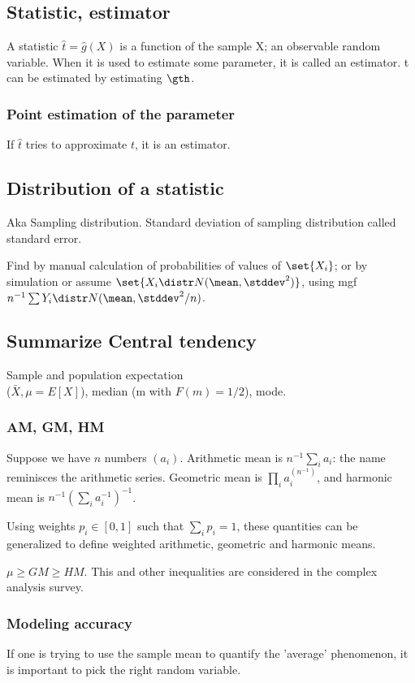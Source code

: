 \documentclass[oneside, article]{memoir}
\begin{document}
\subsection{Statistic, estimator}
A statistic $\hat{t} = \hat{g}(X)$ is a function of the sample X; an observable random variable. When it is used to estimate some parameter, it is called an estimator. t can be estimated by estimating $\gth$.

\subsubsection{Point estimation of the parameter}
If $\hat{t}$ tries to approximate $t$, it is an estimator.

\subsection{Distribution of a statistic}
Aka Sampling distribution. Standard deviation of sampling distribution called standard error.

Find by manual calculation of probabilities of values of $\set{X_{i}}$; or by simulation or assume $\set{X_{i} \distr N(\mean, \stddev^{2})}$, using mgf $n^{-1}\sum Y_{i} \distr N(\mean, \stddev^{2}/n)$.

\subsection{Summarize Central tendency}
Sample and population expectation \\
($\bar{X}, \mu = E[X]$), median (m with $F(m) = 1/2$), mode.

\subsubsection{AM, GM, HM}
Suppose we have $n$ numbers $(a_i)$. Arithmetic mean is $n^{-1}\sum_i a_i$: the name reminisces the arithmetic series. Geometric mean is $\prod_i a_i^(n^{-1})$, and harmonic mean is $n^{-1}(\sum_i a_i^{-1})^{-1}$.

Using weights $p_i \in [0, 1]$ such that $\sum_i p_i = 1$, these quantities can be generalized to define weighted arithmetic, geometric and harmonic means.

$\mu \geq GM \geq HM$. This and other inequalities are considered in the complex analysis survey.

\subsubsection{Modeling accuracy}
If one is trying to use the sample mean to quantify the 'average' phenomenon, it is important to pick the right random variable.
\end{document}
